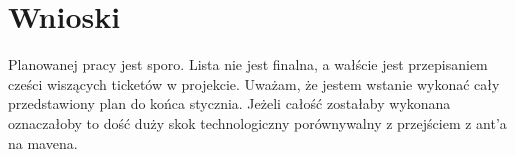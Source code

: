 \documentclass[16pt]{article}
\begin{document}
\section{Wnioski}
Planowanej pracy jest sporo. Lista nie jest finalna, a wałście jest przepisaniem cześci wiszących ticketów w projekcie. Uważam, że jestem wstanie wykonać cały przedstawiony plan do końca stycznia. Jeżeli całość zostałaby wykonana oznaczałoby to dość duży skok technologiczny porównywalny z przejściem z ant'a na mavena.
\end{document}
